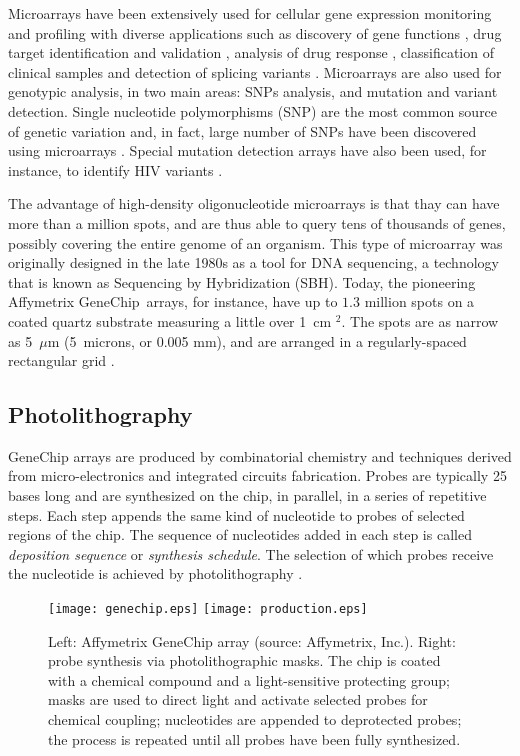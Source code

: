 Microarrays have been extensively used for cellular gene expression monitoring
and profiling \citep{Schena1995,Lockhart1996} with diverse applications such as
discovery of gene functions \citep{Cho1998,Hughes2000}, drug target
identification and validation \citep{Marton1998,Liotta2000}, analysis of drug
response \citep{Debouck1999}, classification of clinical samples
\citep{Perou1999} and detection of splicing variants \citep{Hu2001}. Microarrays
are also used for genotypic analysis, in two main areas: SNPs analysis, and
mutation and variant detection. Single nucleotide polymorphisms (SNP) are the
most common source of genetic variation and, in fact, large number of SNPs have
been discovered using microarrays \citep{Lindblad-Toh2000}. Special mutation
detection arrays have also been used, for instance, to identify HIV variants
\citep{Kozal1996}.

The advantage of high-density oligonucleotide microarrays is that thay can have
more than a million spots, and are thus able to query tens of thousands of
genes, possibly covering the entire genome of an organism. This type of
microarray was originally designed in the late 1980s as a tool for DNA
sequencing, a technology that is known as Sequencing by Hybridization (SBH).
Today, the pioneering Affymetrix GeneChip\textR\ arrays, for instance, have up
to $1.3$ million spots on a coated quartz substrate measuring a little over 1~cm
$^2$. The spots are as narrow as 5~$\mu$m (5~microns, or 0.005 mm), and are
arranged in a regularly-spaced rectangular grid \citep{McGall2002}.

\subsection{Photolithography}

GeneChip arrays are produced by combinatorial chemistry and techniques derived
from micro-electronics and integrated circuits fabrication. Probes are typically
25 bases long and are synthesized on the chip, in parallel, in a series of
repetitive steps. Each step appends the same kind of nucleotide to probes of
selected regions of the chip. The sequence of nucleotides added in each step is
called \emph{deposition sequence} or \emph{synthesis schedule}. The selection of
which probes receive the nucleotide is achieved by photolithography
\citep{Fodor1991,Fodor1993,Lipshutz1999}.

\begin{figure}[t]\centering
\texttt{[image: genechip.eps]}
\hfill
\texttt{[image: production.eps]}
\caption{Left: Affymetrix GeneChip array (source: Affymetrix, Inc.). Right:
probe synthesis via photolithographic masks. The chip is coated with a chemical
compound and a light-sensitive protecting group; masks are used to direct light
and activate selected probes for chemical coupling; nucleotides are appended to
deprotected probes; the process is repeated until all probes have been fully
synthesized.}
\label{fig:photolithography}
\end{figure}

